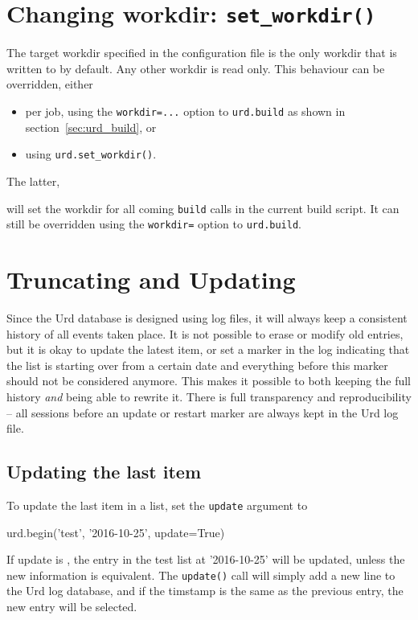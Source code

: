 \section{Changing workdir:  \texttt{set\_workdir()}}
The target workdir specified in the configuration file is the only
workdir that is written to by default.  Any other workdir is read
only.  This behaviour can be overridden, either
\begin{itemize}
\item[] per job, using the \texttt{workdir=...} option to \texttt{urd.build} as shown in section~\ref{sec:urd_build}, or
\item[] using \texttt{urd.set\_workdir()}.
\end{itemize}
The latter,
\begin{python}
def main(urd):
    urd.set_workdir(<workdir>)}
\end{python}
will set the workdir for all coming \texttt{build} calls in the
current build script.  It can still be overridden using
the \texttt{workdir=} option to \texttt{urd.build}.















\section{Truncating and Updating}
\label{sec:trunc-update}
Since the Urd database is designed using log files, it will always
keep a consistent history of all events taken place.  It is not
possible to erase or modify old entries, but it is okay to update the
latest item, or set a marker in the log indicating that the list is
starting over from a certain date and everything before this marker
should not be considered anymore.  This makes it possible to both
keeping the full history \textsl{and} being able to rewrite it.  There
is full transparency and reproducibility -- all sessions before an
update or restart marker are always kept in the Urd log file.



\subsection{Updating the last item}
To update the last item in a list, set the \texttt{update} argument
to \pyTrue
\begin{python}
urd.begin('test', '2016-10-25', update=True)
\end{python}
If update is \pyTrue, the entry in the test list at '2016-10-25' will
be updated, unless the new information is equivalent.
The \texttt{update()} call will simply add a new line to the Urd log
database, and if the timstamp is the same as the previous entry, the
new entry will be selected.



